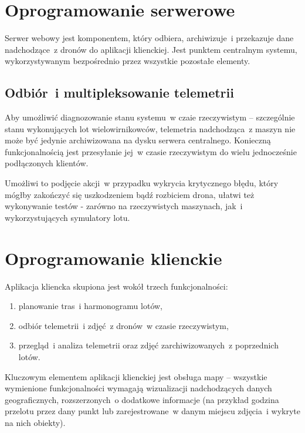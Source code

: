 \section{Oprogramowanie serwerowe}

Serwer webowy jest komponentem, który odbiera, archiwizuje~i przekazuje
dane nadchodzące~z dronów do aplikacji klienckiej. Jest punktem centralnym systemu,
wykorzystywanym bezpośrednio przez wszystkie pozostałe elementy.

\subsection{Odbiór~i multipleksowanie telemetrii}

Aby umożliwić diagnozowanie stanu systemu~w czaie rzeczywistym -- szczególnie
stanu wykonujących lot wielowirnikowców, telemetria nadchodząca~z maszyn nie może być
jedynie archiwizowana na dysku serwera centralnego. Konieczną funkcjonalnością jest
przesyłanie jej~w czasie rzeczywistym do wielu jednocześnie podłączonych klientów.

Umożliwi to podjęcie akcji~w przypadku wykrycia krytycznego błędu, który mógłby
zakończyć się uszkodzeniem bądź rozbiciem drona, ułatwi też wykonywanie testów - zarówno
na rzeczywistych maszynach, jak~i wykorzystujących symulatory lotu.

\section{Oprogramowanie klienckie}

Aplikacja kliencka skupiona jest wokół trzech funkcjonalności:

\begin{enumerate}
    \item planowanie tras~i harmonogramu lotów,
    \item odbiór telemetrii~i zdjęć~z dronów~w czasie rzeczywistym,
    \item przegląd~i analiza telemetrii oraz zdjęć zarchiwizowanych~z poprzednich lotów.
\end{enumerate}

Kluczowym elementem aplikacji klienckiej jest obsługa mapy -- wszystkie
wymienione funkcjonalności wymagają wizualizacji nadchodzących danych geograficznych,
rozszerzonych~o dodatkowe informacje (na przykład godzina przelotu przez dany punkt lub
zarejestrowane~w danym miejscu zdjęcia~i wykryte na nich obiekty).